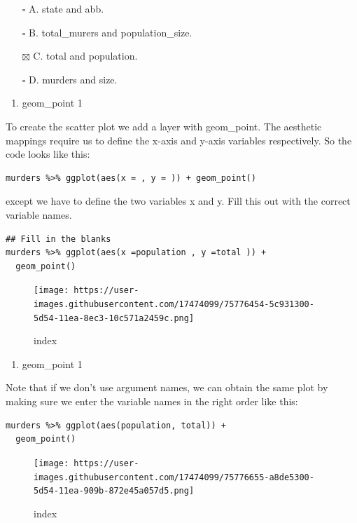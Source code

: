 \documentclass[
]{article}
\providecommand{\tightlist}{%
  \setlength{\itemsep}{0pt}\setlength{\parskip}{0pt}}
\begin{document}
\begin{itemize}
\tightlist
\item[$\square$]
  A. state and abb.
\item[$\square$]
  B. total\_murers and population\_size.
\item[$\boxtimes$]
  C. total and population.
\item[$\square$]
  D. murders and size.
\end{itemize}

\begin{enumerate}
\def\labelenumi{\arabic{enumi}.}
\setcounter{enumi}{4}
\tightlist
\item
  geom\_point 1
\end{enumerate}

To create the scatter plot we add a layer with geom\_point. The
aesthetic mappings require us to define the x-axis and y-axis variables
respectively. So the code looks like this:

\begin{verbatim}
murders %>% ggplot(aes(x = , y = )) + geom_point()
\end{verbatim}

except we have to define the two variables x and y. Fill this out with
the correct variable names.

\begin{verbatim}
## Fill in the blanks
murders %>% ggplot(aes(x =population , y =total )) +
  geom_point()
\end{verbatim}

\begin{figure}
\centering
\texttt{[image: https://user-images.githubusercontent.com/17474099/75776454-5c931300-5d54-11ea-8ec3-10c571a2459c.png]}
\caption{index}
\end{figure}

\begin{enumerate}
\def\labelenumi{\arabic{enumi}.}
\setcounter{enumi}{5}
\tightlist
\item
  geom\_point 1
\end{enumerate}

Note that if we don't use argument names, we can obtain the same plot by
making sure we enter the variable names in the right order like this:

\begin{verbatim}
murders %>% ggplot(aes(population, total)) +
  geom_point()
\end{verbatim}

\begin{figure}
\centering
\texttt{[image: https://user-images.githubusercontent.com/17474099/75776655-a8de5300-5d54-11ea-909b-872e45a057d5.png]}
\caption{index}
\end{figure}
\end{document}
